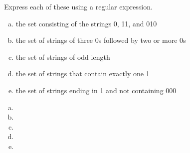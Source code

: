 \documentclass[../main.tex]{subfiles}
\begin{document}
Express each of these using a regular expression.
\begin{enumerate}[a)]
	\item the set consisting of the strings 0, 11, and 010
	\item the set of strings of three 0s followed by two or more 0s
	\item the set of strings of odd length
	\item the set of strings that contain exactly one 1
	\item the set of strings ending in 1 and not containing 000
\end{enumerate}

\solution
\begin{enumerate}[a)]
	\item 
	\item 
	\item 
	\item 
	\item 
\end{enumerate}
\end{document}
